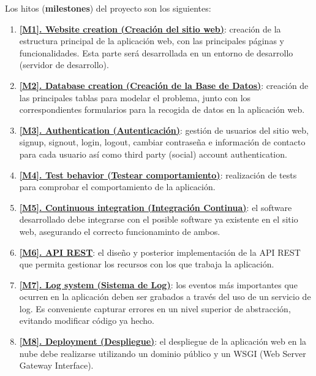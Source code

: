 Los hitos (\textbf{milestones}) del proyecto son los siguientes:
\begin{enumerate}
    \item \textbf{\href{https://github.com/alexespana/TFG/milestone/1}{[M1]. Website
    creation (Creación del sitio web)}}: creación de la estructura principal de la
    aplicación web, con las principales páginas y funcionalidades. Esta parte será
    desarrollada en un entorno de desarrollo (servidor de desarrollo).
    \item \textbf{\href{https://github.com/alexespana/TFG/milestone/8}{[M2]. Database
    creation (Creación de la Base de Datos)}}: creación de las principales tablas para
    modelar el problema, junto con los correspondientes formularios para la recogida de
    datos en la aplicación web.
    \item \textbf{\href{https://github.com/alexespana/TFG/milestone/2}{[M3]. Authentication
    (Autenticación)}}: gestión de usuarios del sitio web, signup, signout, login, logout,
    cambiar contraseña e información de contacto para cada usuario así como third party
    (social) account authentication. 
    \item \textbf{\href{https://github.com/alexespana/TFG/milestone/3}{[M4]. Test behavior
    (Testear comportamiento)}}: realización de tests para comprobar el comportamiento
    de la aplicación.
    \item \textbf{\href{https://github.com/alexespana/TFG/milestone/4}{[M5]. Continuous
    integration (Integración Continua)}}: el software desarrollado debe integrarse con el
    posible software ya existente en el sitio web, asegurando el correcto funcionaminto
    de ambos.
    \item \textbf{\href{https://github.com/alexespana/TFG/milestone/6}{[M6]. API REST}}:
    el diseño y posterior implementación de la API REST que permita gestionar los recursos
    con los que trabaja la aplicación.
    \item \textbf{\href{https://github.com/alexespana/TFG/milestone/5}{[M7]. Log system
    (Sistema de Log)}}: los eventos más importantes que ocurren en la aplicación deben ser
    grabados a través del uso de un servicio de log. Es conveniente capturar errores en un
    nivel superior de abstracción, evitando modificar código ya hecho.
    \item \textbf{\href{https://github.com/alexespana/TFG/milestone/7}{[M8]. Deployment
    (Despliegue)}}: el despliegue de la aplicación web en la nube debe realizarse utilizando
    un dominio público y un WSGI (Web Server Gateway Interface).
\end{enumerate}

